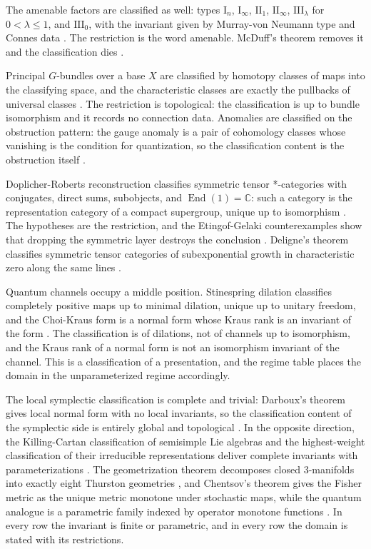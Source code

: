 \documentclass[11pt,letterpaper]{article}
\theoremstyle{definition}
\theoremstyle{remark}
\begin{document}
The amenable factors are classified as well: types $\mathrm{I}_n$, $\mathrm{I}_\infty$, $\mathrm{II}_1$, $\mathrm{II}_\infty$, $\mathrm{III}_\lambda$ for $0 < \lambda \leq 1$, and $\mathrm{III}_0$, with the invariant given by Murray-von Neumann type and Connes data \cite{connes1976,vnwiki}. The restriction is the word amenable. McDuff's theorem removes it and the classification dies \cite{mcduff1969}.

Principal $G$-bundles over a base $X$ are classified by homotopy classes of maps into the classifying space, and the characteristic classes are exactly the pullbacks of universal classes \cite{cstarwiki}. The restriction is topological: the classification is up to bundle isomorphism and it records no connection data. Anomalies are classified on the obstruction pattern: the gauge anomaly is a pair of cohomology classes whose vanishing is the condition for quantization, so the classification content is the obstruction itself \cite{cstarwiki}.

Doplicher-Roberts reconstruction classifies symmetric tensor *-categories with conjugates, direct sums, subobjects, and $\operatorname{End}(1) = \mathbb{C}$: such a category is the representation category of a compact supergroup, unique up to isomorphism \cite{eg2000}. The hypotheses are the restriction, and the Etingof-Gelaki counterexamples show that dropping the symmetric layer destroys the conclusion \cite{eg2000}. Deligne's theorem classifies symmetric tensor categories of subexponential growth in characteristic zero along the same lines \cite{eg2000}.

Quantum channels occupy a middle position. Stinespring dilation classifies completely positive maps up to minimal dilation, unique up to unitary freedom, and the Choi-Kraus form is a normal form whose Kraus rank is an invariant of the form \cite{stinespring,cstarwiki}. The classification is of dilations, not of channels up to isomorphism, and the Kraus rank of a normal form is not an isomorphism invariant of the channel. This is a classification of a presentation, and the regime table places the domain in the unparameterized regime accordingly.

The local symplectic classification is complete and trivial: Darboux's theorem gives local normal form with no local invariants, so the classification content of the symplectic side is entirely global and topological \cite{darboux}. In the opposite direction, the Killing-Cartan classification of semisimple Lie algebras and the highest-weight classification of their irreducible representations deliver complete invariants with parameterizations \cite{humphreys,fultonharris}. The geometrization theorem decomposes closed 3-manifolds into exactly eight Thurston geometries \cite{geometrization}, and Chentsov's theorem gives the Fisher metric as the unique metric monotone under stochastic maps, while the quantum analogue is a parametric family indexed by operator monotone functions \cite{petzsudar}. In every row the invariant is finite or parametric, and in every row the domain is stated with its restrictions.
\end{document}
